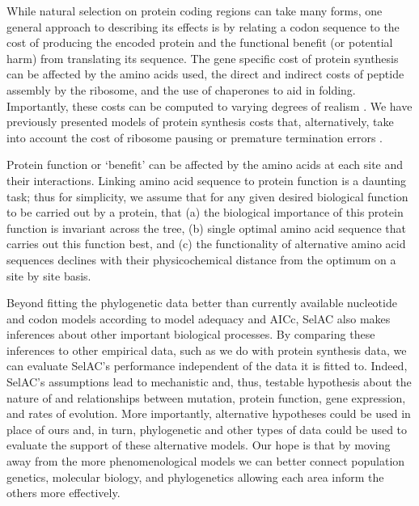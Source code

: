 \documentclass[onecolumn,letterpaper,fleqn,nogrid]{myMBE}%
\newcommand{\PC}{physicochemical\xspace}
\newcommand{\selac}{SelAC\xspace}
\begin{document}
While natural selection on protein coding regions can take many forms, one general approach to describing its effects is by relating a codon sequence to the cost of producing the encoded protein and the functional benefit (or potential harm) from translating its sequence.
The gene specific cost of protein synthesis can be affected by the amino acids used, the direct and indirect costs of peptide assembly by the ribosome, and the use of chaperones to aid in folding.
Importantly, these costs can be computed to varying degrees of realism \citep[e.g.][]{Wagner2005,LynchAndMarinov2015}.
We have previously presented models of protein synthesis costs that, alternatively, take into account the cost of ribosome pausing \citep{ShahAndGilchrist2011} or premature termination errors \citep{GilchristAndWagner2006,Gilchrist2007,GilchristEtAl2009}.

Protein function or `benefit' can be affected by the amino acids at each site and their interactions.
Linking amino acid sequence to protein function is a daunting task; thus for simplicity, we assume that for any given desired biological function to be carried out by a protein, that (a) the biological importance of this protein function is invariant across the tree, (b) single optimal amino acid sequence that carries out this function best, and (c) the functionality of alternative amino acid sequences declines with their \PC distance from the optimum on a site by site basis.

Beyond fitting the phylogenetic data better than currently available nucleotide and codon models according to model adequacy and AICc, \selac also makes inferences about other important biological processes.
By comparing these inferences to other empirical data, such as we do with protein synthesis data, we can evaluate \selac's performance independent of the data it is fitted to.
Indeed, \selac's assumptions lead to mechanistic and, thus, testable hypothesis about the nature of and relationships between mutation, protein function, gene expression, and rates of evolution.
More importantly, alternative hypotheses could be used in place of ours and, in turn, phylogenetic and other types of data could be used to evaluate the support of these alternative models.
Our hope is that by moving away from the more phenomenological models we can better connect population genetics, molecular biology, and phylogenetics allowing each area inform the others more effectively.
\end{document}
